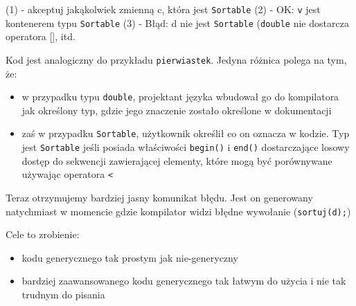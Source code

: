 \documentclass[11pt, a4paper]{article}
\begin{document}
\noindent (1) - akceptuj jakąkolwiek zmienną c, która jest \verb#Sortable# \newline
(2) - OK: \verb#v# jest kontenerem typu \verb#Sortable# \newline
(3) - Błąd: d nie jest \verb#Sortable# (\verb#double# nie dostarcza operatora [], itd. \newline

Kod jest analogiczny do przykładu \verb#pierwiastek#. Jedyna różnica polega na tym, że:
\begin{itemize}

\item w przypadku typu \verb#double#, projektant języka wbudował go do kompilatora jak określony typ, gdzie jego znaczenie zostało określone w dokumentacji

\item zaś w przypadku \verb#Sortable#, użytkownik określił co on oznacza w kodzie. Typ jest \verb#Sortable# jeśli posiada właściwości \verb#begin()# i \verb#end()# dostarczające losowy dostęp do sekwencji zawierającej elementy, które mogą być porównywane używając operatora \verb#<#

\end{itemize}

Teraz otrzymujemy bardziej jasny komunikat błędu. Jest on generowany natychmiast w momencie gdzie kompilator widzi błędne wywołanie (\verb#sortuj(d);#)

Cele to zrobienie:
\begin{itemize}

\item kodu generycznego tak prostym jak nie-generyczny

\item bardziej zaawansowanego kodu generycznego tak łatwym do użycia i nie tak trudnym do
pisania

\end{itemize}
\end{document}
